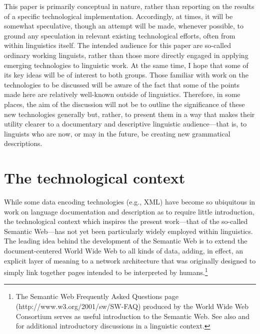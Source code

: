 This paper is primarily conceptual in nature, rather than reporting on the
results of a specific technological implementation. Accordingly, at times, it
will be somewhat speculative, though an attempt will be made, whenever possible,
to ground any speculation in relevant existing technological efforts, often from
within linguistics itself. The intended audience for this paper are so-called
ordinary working linguists, rather than those more directly engaged in applying
emerging technologies to linguistic work. At the same time, I hope that some of
its key ideas will be of interest to both groups. Those familiar with work on
the technologies to be discussed will be aware of the fact that some of the
points made here are relatively well-known outside of linguistics. Therefore, in
some places, the aim of the discussion will not be to outline the significance
of these new technologies generally but, rather, to present them in a way that
makes their utility clearer to a documentary and descriptive linguistic
audience---that is, to linguists who are now, or may in the future, be creating
new grammatical descriptions.



\section{The technological context\label{Context}}

While some data encoding technologies (e.g., XML) have become so ubiquitous in
work on language documentation and description as to require little
introduction, the technological context which inspires the present work---that
of the so-called Semantic Web---has not yet been particularly widely employed
within linguistics. The leading idea behind the development of the Semantic Web
is to extend the document-centered World Wide Web to all kinds of data, adding,
in effect, an explicit layer of meaning to a network architecture that was
originally designed to simply link together pages intended to be interpreted by
humans.{\footnote{The Semantic Web Frequently Asked Questions page
({http://www.w3.org/2001/sw/SW-FAQ}) produced by the World Wide Web Consortium
serves as useful introduction to the Semantic Web. See also
 and 
for additional introductory discussions in a linguistic context.}}


